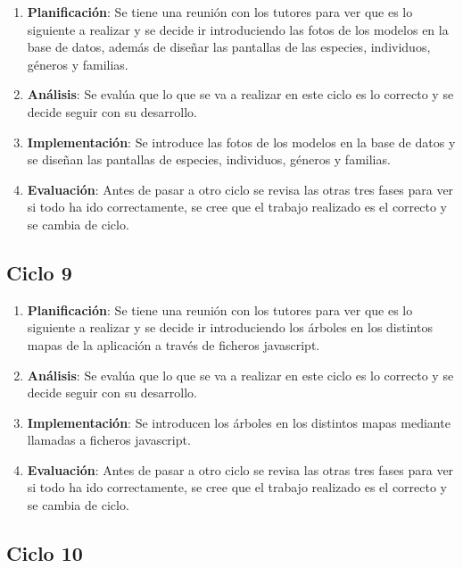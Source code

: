 \begin{enumerate}
	\item \textbf{Planificación}: Se tiene una reunión con los tutores para ver que es lo siguiente a realizar y se decide ir introduciendo las fotos de los modelos en la base de datos, además de diseñar las pantallas de las especies, individuos, géneros y familias.
	\item \textbf{Análisis}: Se evalúa que lo que se va a realizar en este ciclo es lo correcto y se decide seguir con su desarrollo.
	\item \textbf{Implementación}: Se introduce las fotos de los modelos en la base de datos y se diseñan las pantallas de especies, individuos, géneros y familias.
	\item \textbf{Evaluación}: Antes de pasar a otro ciclo se revisa las otras tres fases para ver si todo ha ido correctamente, se cree que el trabajo realizado es el correcto y se cambia de ciclo.
\end{enumerate}

\subsection{Ciclo 9}

\begin{enumerate}
	\item \textbf{Planificación}: Se tiene una reunión con los tutores para ver que es lo siguiente a realizar y se decide ir introduciendo los árboles en los distintos mapas de la aplicación a través de ficheros javascript.
	\item \textbf{Análisis}: Se evalúa que lo que se va a realizar en este ciclo es lo correcto y se decide seguir con su desarrollo.
	\item \textbf{Implementación}: Se introducen los árboles en los distintos mapas mediante llamadas a ficheros javascript.
	\item \textbf{Evaluación}: Antes de pasar a otro ciclo se revisa las otras tres fases para ver si todo ha ido correctamente, se cree que el trabajo realizado es el correcto y se cambia de ciclo.
\end{enumerate}

\subsection{Ciclo 10}

